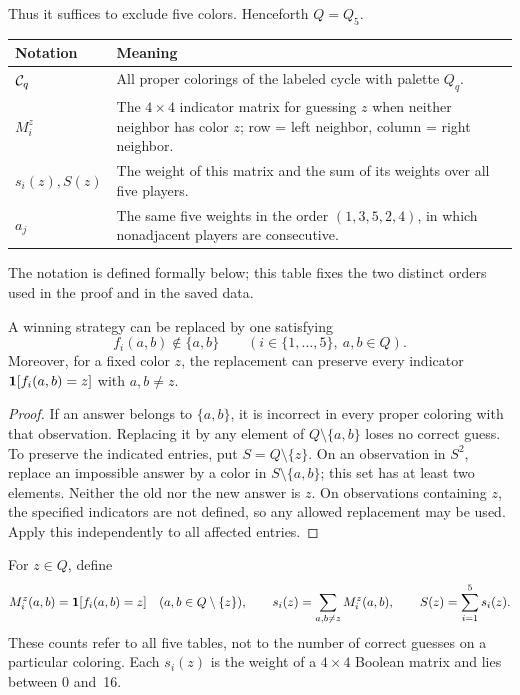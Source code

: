 Thus it suffices to exclude five colors. Henceforth $Q=Q_5$.

\begin{center}\small
\begin{tabular}{@{}lp{10.3cm}@{}}
\toprule
Notation&Meaning\\
\midrule
$\mathcal{C}_q$&All proper colorings of the labeled cycle with palette $Q_q$.\\
$M_i^z$&The $4\times4$ indicator matrix for guessing $z$ when neither
neighbor has color $z$; row = left neighbor, column = right neighbor.\\
$s_i(z),S(z)$&The weight of this matrix and the sum of its weights over all five players.\\
$a_j$&The same five weights in the order $(1,3,5,2,4)$, in which
nonadjacent players are consecutive.\\
\bottomrule
\end{tabular}
\end{center}
The notation is defined formally below; this table fixes the two distinct
orders used in the proof and in the saved data.

\begin{lemma}\label{lem:normalization}
A winning strategy can be replaced by one satisfying
\begin{equation}\label{eq:normalization}
f_i(a,b)\notin\{a,b\}
\qquad(i\in\{1,\ldots,5\},\ a,b\in Q).
\end{equation}
Moreover, for a fixed color $z$, the replacement can preserve every
indicator $\mathbf{1}[f_i(a,b)=z]$ with $a,b\ne z$.
\end{lemma}
\begin{proof}
If an answer belongs to $\{a,b\}$, it is incorrect in every proper coloring
with that observation. Replacing it by any element of
$Q\setminus\{a,b\}$ loses no correct guess. To preserve the indicated
entries, put $S=Q\setminus\{z\}$. On an observation in $S^2$, replace an
impossible answer by a color in $S\setminus\{a,b\}$; this set has at least
two elements. Neither the old nor the new answer is $z$. On observations
containing $z$, the specified indicators are not defined, so any allowed
replacement may be used. Apply this independently to all affected entries.
\end{proof}

For $z\in Q$, define
\begin{equation}\label{eq:counts}
M_i^z(a,b)=\mathbf{1}[f_i(a,b)=z]\quad(a,b\in Q\setminus\{z\}),\qquad
s_i(z)=\sum_{a,b\ne z}M_i^z(a,b),\qquad
S(z)=\sum_{i=1}^5s_i(z).
\end{equation}
These counts refer to all five tables, not to the number of correct guesses
on a particular coloring. Each $s_i(z)$ is the weight of a $4\times4$
Boolean matrix and lies between 0 and~16.

